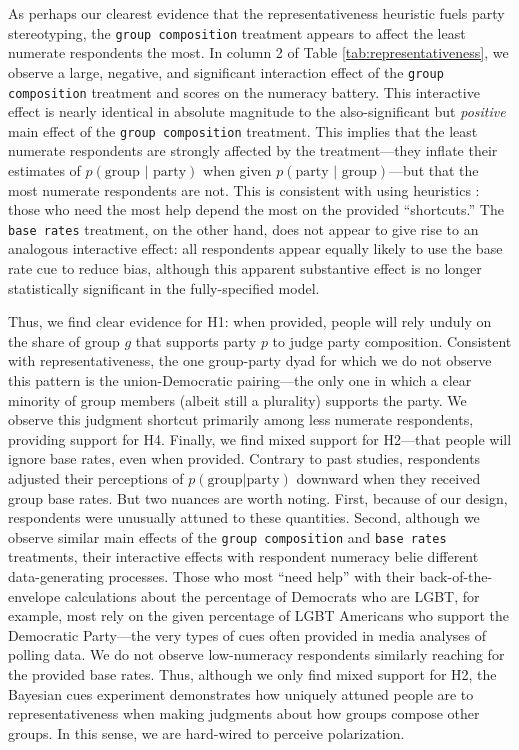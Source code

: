 \documentclass[12pt, letterpaper]{article}
\begin{document}


As perhaps our clearest evidence that the representativeness heuristic fuels party stereotyping, the {\tt group composition} treatment appears to affect the least numerate respondents the most. In column 2 of Table \ref{tab:representativeness}, we observe a large, negative, and significant interaction effect of the {\tt group composition} treatment and scores on the numeracy battery. This interactive effect is nearly identical in absolute magnitude to the also-significant but \emph{positive} main effect of the {\tt group composition} treatment. This implies that the least numerate respondents are strongly affected by the treatment---they inflate their estimates of $p(\text{group | party})$ when given $p(\text{party | group})$---but that the most numerate respondents are not. This is consistent with using heuristics \citep{kahneman1972subjective}: those who need the most help depend the most on the provided ``shortcuts.'' The {\tt base rates} treatment, on the other hand, does not appear to give rise to an analogous interactive effect: all respondents appear equally likely to use the base rate cue to reduce bias, although this apparent substantive effect is no longer statistically significant in the fully-specified model.

Thus, we find clear evidence for H1: when provided, people will rely unduly on the share of group $g$ that supports party $p$ to judge party composition. Consistent with representativeness, the one group-party dyad for which we do not observe this pattern is the union-Democratic pairing---the only one in which a clear minority of group members (albeit still a plurality) supports the party. We observe this judgment shortcut primarily among less numerate respondents, providing support for H4. Finally, we find mixed support for H2---that people will ignore base rates, even when provided. Contrary to past studies, respondents adjusted their perceptions of $p(\text{group|party})$ downward when they received group base rates. But two nuances are worth noting. First, because of our design, respondents were unusually attuned to these quantities. Second, although we observe similar main effects of the {\tt group composition} and {\tt base rates} treatments, their interactive effects with respondent numeracy belie different data-generating processes. Those who most ``need help'' with their back-of-the-envelope calculations about the percentage of Democrats who are LGBT, for example, most rely on the given percentage of LGBT Americans who support the Democratic Party---the very types of cues often provided in media analyses of polling data. We do not observe low-numeracy respondents similarly reaching for the provided base rates. Thus, although we only find mixed support for H2, the Bayesian cues experiment demonstrates how uniquely attuned people are to representativeness when making judgments about how groups compose other groups. In this sense, we are hard-wired to perceive polarization. 
\end{document}
